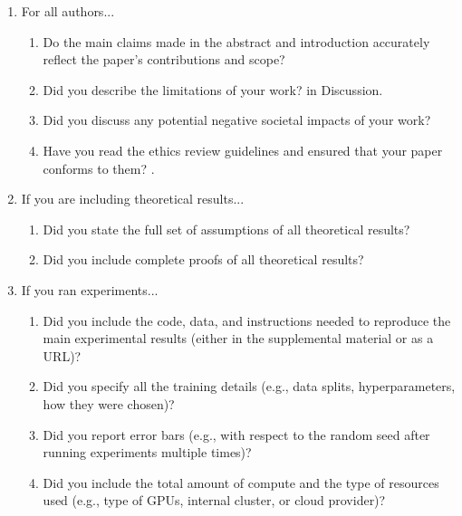 \documentclass{article}
\begin{document}
\begin{enumerate}

\item For all authors...
\begin{enumerate}
  \item Do the main claims made in the abstract and introduction accurately reflect the paper's contributions and scope?
    \answerYes{} %
  \item Did you describe the limitations of your work?
    \answerYes{} in Discussion. %
  \item Did you discuss any potential negative societal impacts of your work?
  \item Have you read the ethics review guidelines and ensured that your paper conforms to them?
    \answerYes{}. %
\end{enumerate}

\item If you are including theoretical results...
\begin{enumerate}
  \item Did you state the full set of assumptions of all theoretical results?
    \answerNA{} %
	\item Did you include complete proofs of all theoretical results?
    \answerNA{} %
\end{enumerate}

\item If you ran experiments...
\begin{enumerate}
  \item Did you include the code, data, and instructions needed to reproduce the main experimental results (either in the supplemental material or as a URL)?
  \item Did you specify all the training details (e.g., data splits, hyperparameters, how they were chosen)?
	\item Did you report error bars (e.g., with respect to the random seed after running experiments multiple times)?
	\item Did you include the total amount of compute and the type of resources used (e.g., type of GPUs, internal cluster, or cloud provider)?
\end{enumerate}


\end{enumerate}
\end{document}
